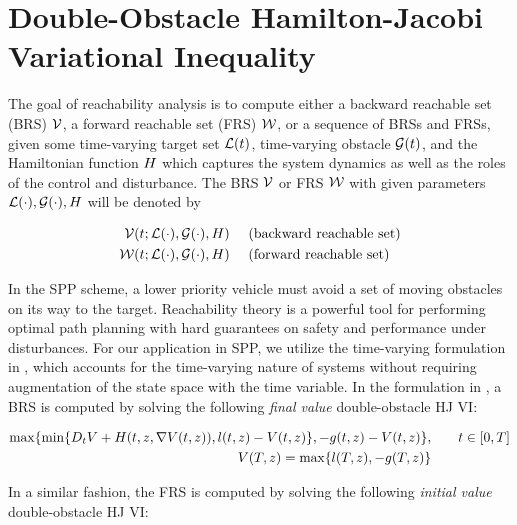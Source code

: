 \section{Double-Obstacle Hamilton-Jacobi Variational Inequality \label{sec:HJIVI}}
The goal of reachability analysis is to compute either a backward reachable set (BRS) $\mathcal{V}$, a forward reachable set (FRS) $\mathcal{W}$, or a sequence of BRSs and FRSs, given some time-varying target set $\mathcal{L}(t)$, time-varying obstacle $\mathcal{G}(t)$, and the Hamiltonian function $H$ which captures the system dynamics as well as the roles of the control and disturbance. The BRS $\mathcal{V}$ or FRS $\mathcal{W}$ with given parameters $\mathcal{L}(\cdot), \mathcal{G}(\cdot), H$ will be denoted by

\begin{equation}
\begin{aligned}
\mathcal{V}(t; \mathcal{L}(\cdot), \mathcal{G}(\cdot), H) &\quad \text{ (backward reachable set)}\\
\mathcal{W}(t; \mathcal{L}(\cdot), \mathcal{G}(\cdot), H) &\quad \text{ (forward reachable set)}
\end{aligned}
\end{equation}

In the SPP scheme, a lower priority vehicle must avoid a set of moving obstacles on its way to the target. Reachability theory is a powerful tool for performing optimal path planning with hard guarantees on safety and performance under disturbances. For our application in SPP, we utilize the time-varying formulation in \cite{}, which accounts for the time-varying nature of systems without requiring augmentation of the state space with the time variable. In the formulation in \cite{}, a BRS is computed by solving the following \textit{final value} double-obstacle HJ VI:

\begin{equation}
\label{eq:HJIVI_BRS}
\begin{aligned}
\max \{ \min \{D_t \valfunc + \ham(t, \state, \nabla \valfunc(t, \state)), \fc(t, \state) - \valfunc(t, \state) \}, -\obsfunc(t, \state) - \valfunc(t, \state) \}, &\qquad t \in [0, T] \\
\valfunc(T, \state) = \max\{\fc(T, \state), -\obsfunc(T, \state)\}&
\end{aligned}
\end{equation}

In a similar fashion, the FRS is computed by solving the following \textit{initial value} double-obstacle HJ VI:

